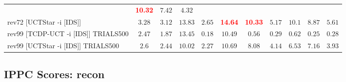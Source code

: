 \documentclass{article}
\begin{document}
\begin{tabular}{|l|r@{$\pm$}rr@{$\pm$}rr@{$\pm$}rr@{$\pm$}rr@{$\pm$}rr@{$\pm$}rr@{$\pm$}rr@{$\pm$}rr@{$\pm$}rr@{$\pm$}r|}
& \multicolumn{2}{c}{\textbf{\textcolor{red}{10.32}}}
& \multicolumn{2}{c}{$7.42$}
& \multicolumn{2}{c|}{$4.32$}
\\
rev72 [UCTStar -i [IDS]]
& \multicolumn{2}{c}{$3.28$}
& \multicolumn{2}{c}{$3.12$}
& \multicolumn{2}{c}{$13.83$}
& \multicolumn{2}{c}{$2.65$}
& \multicolumn{2}{c}{\textbf{\textcolor{red}{14.64}}}
& \multicolumn{2}{c}{\textbf{\textcolor{red}{10.33}}}
& \multicolumn{2}{c}{$5.17$}
& \multicolumn{2}{c}{$10.1$}
& \multicolumn{2}{c}{$8.87$}
& \multicolumn{2}{c|}{$5.61$}
\\
\hline
rev99 [TCDP-UCT -i [IDS]] TRIALS500
& \multicolumn{2}{c}{$2.47$}
& \multicolumn{2}{c}{$1.87$}
& \multicolumn{2}{c}{$13.45$}
& \multicolumn{2}{c}{$0.18$}
& \multicolumn{2}{c}{$10.49$}
& \multicolumn{2}{c}{$0.56$}
& \multicolumn{2}{c}{$0.29$}
& \multicolumn{2}{c}{$0.62$}
& \multicolumn{2}{c}{$0.25$}
& \multicolumn{2}{c|}{$0.28$}
\\
rev99 [UCTStar -i [IDS]] TRIALS500
& \multicolumn{2}{c}{$2.6$}
& \multicolumn{2}{c}{$2.44$}
& \multicolumn{2}{c}{$10.02$}
& \multicolumn{2}{c}{$2.27$}
& \multicolumn{2}{c}{$10.69$}
& \multicolumn{2}{c}{$8.08$}
& \multicolumn{2}{c}{$4.14$}
& \multicolumn{2}{c}{$6.53$}
& \multicolumn{2}{c}{$7.16$}
& \multicolumn{2}{c|}{$3.93$}
\\
\hline
\end{tabular}%

\bigskip

\subsection*{IPPC Scores: recon}
\end{document}
